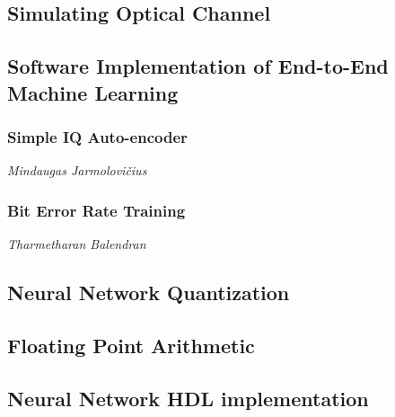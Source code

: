 \subsection{Simulating Optical Channel}
\subsection{Software Implementation of End-to-End Machine Learning}

    \subsubsection{Simple IQ Auto-encoder}
    \hspace*{0pt}\hfill \textit{Mindaugas Jarmolovi\v{c}ius}\\
    
    \subsubsection{Bit Error Rate Training}
    \hspace*{0pt}\hfill \textit{Tharmetharan Balendran}\\
    


\subsection{Neural Network Quantization}

    \subsubsection{}
    
\subsection{Floating Point Arithmetic}
\subsection{Neural Network HDL implementation}

    